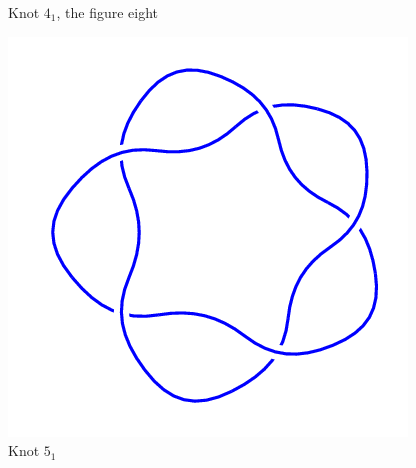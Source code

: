 \documentclass{article}
\begin{document}
\begin{figure}[!htb]
\caption{Knot $4_1$, the figure eight}
\endminipage\hfill
{}
\includegraphics[width=\linewidth]{5_1.png}
\caption{Knot $5_1$}
\endminipage\hfill
\end{figure}
\end{document}
